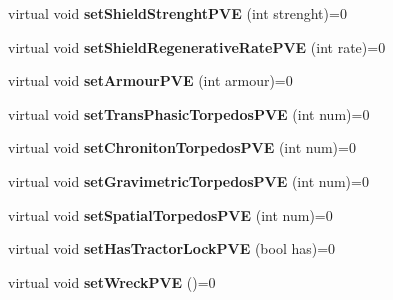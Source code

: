 \begin{DoxyCompactItemize}
\item 
\hypertarget{classPVEEntity_a9ff78957a31e68087dda157baefaebdc}{
virtual void {\bfseries setShieldStrenghtPVE} (int strenght)=0}
\label{df/dde/classPVEEntity_a9ff78957a31e68087dda157baefaebdc}

\item 
\hypertarget{classPVEEntity_a6a17717e26c57959e66a628ecd9bcabf}{
virtual void {\bfseries setShieldRegenerativeRatePVE} (int rate)=0}
\label{df/dde/classPVEEntity_a6a17717e26c57959e66a628ecd9bcabf}

\item 
\hypertarget{classPVEEntity_af16d2b1fc5173c5f7d1e4756bc37d775}{
virtual void {\bfseries setArmourPVE} (int armour)=0}
\label{df/dde/classPVEEntity_af16d2b1fc5173c5f7d1e4756bc37d775}

\item 
\hypertarget{classPVEEntity_a4458ff9d27d95be5e4d8e7d237bc74b9}{
virtual void {\bfseries setTransPhasicTorpedosPVE} (int num)=0}
\label{df/dde/classPVEEntity_a4458ff9d27d95be5e4d8e7d237bc74b9}

\item 
\hypertarget{classPVEEntity_acc7496844abcbb993e84ca115f910fc1}{
virtual void {\bfseries setChronitonTorpedosPVE} (int num)=0}
\label{df/dde/classPVEEntity_acc7496844abcbb993e84ca115f910fc1}

\item 
\hypertarget{classPVEEntity_aa1163c04929940d1127fc01d1933710a}{
virtual void {\bfseries setGravimetricTorpedosPVE} (int num)=0}
\label{df/dde/classPVEEntity_aa1163c04929940d1127fc01d1933710a}

\item 
\hypertarget{classPVEEntity_aa9dfb8aec3a3ebc3c7a9c7ff3935ef1b}{
virtual void {\bfseries setSpatialTorpedosPVE} (int num)=0}
\label{df/dde/classPVEEntity_aa9dfb8aec3a3ebc3c7a9c7ff3935ef1b}

\item 
\hypertarget{classPVEEntity_a9d84e2dfe23bfa674d729566a4dc8033}{
virtual void {\bfseries setHasTractorLockPVE} (bool has)=0}
\label{df/dde/classPVEEntity_a9d84e2dfe23bfa674d729566a4dc8033}

\item 
\hypertarget{classPVEEntity_a072bbcc0e8db91cc27a63d22aafd8904}{
virtual void {\bfseries setWreckPVE} ()=0}
\label{df/dde/classPVEEntity_a072bbcc0e8db91cc27a63d22aafd8904}

\end{DoxyCompactItemize}
